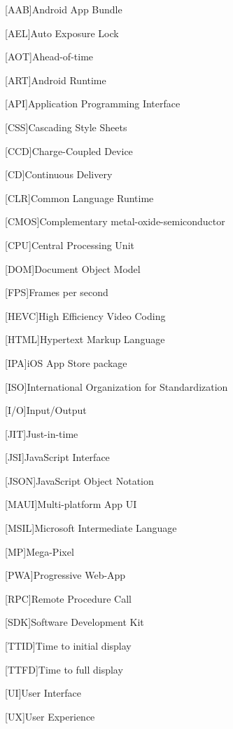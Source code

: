\begin{acronym}[AAAAA]

[AAB]{Android App Bundle}

[AEL]{Auto Exposure Lock}

[AOT]{Ahead-of-time}

[ART]{Android Runtime}

[API]{Application Programming Interface}

[CSS]{Cascading Style Sheets}

[CCD]{Charge-Coupled Device}

[CD]{Continuous Delivery}

[CLR]{Common Language Runtime}

[CMOS]{Complementary metal-oxide-semiconductor}

[CPU]{Central Processing Unit}

[DOM]{Document Object Model}

[FPS]{Frames per second}

[HEVC]{High Efficiency Video Coding}

[HTML]{Hypertext Markup Language}

[IPA]{iOS App Store package}

[ISO]{International Organization for Standardization}

[I/O]{Input/Output}

[JIT]{Just-in-time}

[JSI]{JavaScript Interface}

[JSON]{JavaScript Object Notation}

[MAUI]{Multi-platform App UI}

[MSIL]{Microsoft Intermediate Language}

[MP]{Mega-Pixel}

[PWA]{Progressive Web-App}

[RPC]{Remote Procedure Call}

[SDK]{Software Development Kit}

[TTID]{Time to initial display}

[TTFD]{Time to full display}

[UI]{User Interface}

[UX]{User Experience}

\end{acronym}